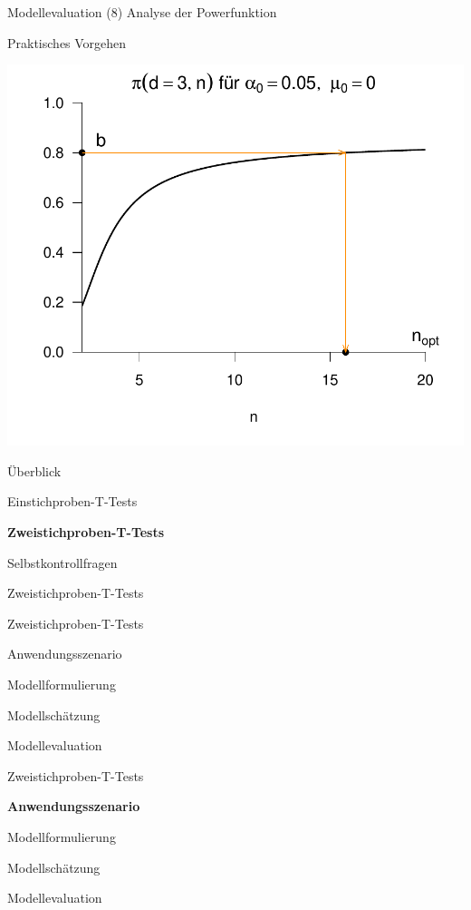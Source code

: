 \documentclass[
  8pt,
  ignorenonframetext,
]{beamer}
\begin{document}
\begin{frame}{Modellevaluation}
\protect\hypertarget{modellevaluation-23}{}
\noindent (8) Analyse der Powerfunktion

Praktisches Vorgehen \vspace{5mm}

\begin{center}\includegraphics[width=0.6\linewidth]{9_Abbildungen/alm_9_t_test_ungerichtet_stichprobengroesse} \end{center}
\end{frame}

\begin{frame}[plain]{}
\protect\hypertarget{section-6}{}
\large
{}
\vfill

Überblick

Einstichproben-T-Tests

\textbf{Zweistichproben-T-Tests}

Selbstkontrollfragen \vfill
\end{frame}

\begin{frame}[plain]{}
\protect\hypertarget{section-7}{}
\center
\huge
\vfill

\noindent Zweistichproben-T-Tests \vfill
\end{frame}

\begin{frame}{Zweistichproben-T-Tests}
\protect\hypertarget{zweistichproben-t-tests}{}
\large
{}
\vfill

Anwendungsszenario

Modellformulierung

Modellschätzung

Modellevaluation \vfill
\end{frame}

\begin{frame}{Zweistichproben-T-Tests}
\protect\hypertarget{zweistichproben-t-tests-1}{}
\large
{}
\vfill

\textbf{Anwendungsszenario}

Modellformulierung

Modellschätzung

Modellevaluation \vfill
\end{frame}
\end{document}
